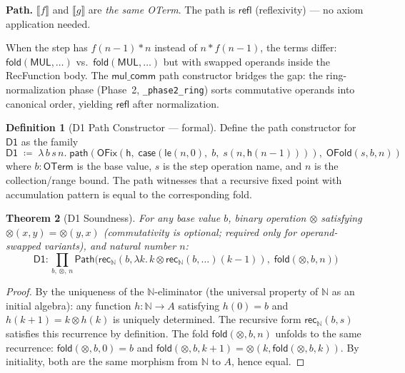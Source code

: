 \documentclass[11pt,a4paper]{report}
\theoremstyle{definition}
\newtheorem{definition}{Definition}[chapter]
\theoremstyle{plain}
\newtheorem{theorem}[definition]{Theorem}
\newcommand{\den}[1]{\llbracket #1 \rrbracket}
\newcommand{\Path}{\mathsf{Path}}
\newcommand{\Nat}{\mathbb{N}}
\newcommand{\fold}{\mathsf{fold}}
\newcommand{\rec}{\mathsf{rec}}
\begin{document}
\textbf{Path.}
$\den{f}$ and $\den{g}$ are \emph{the same OTerm}.  The path is
$\mathsf{refl}$ (reflexivity) --- no axiom application needed.

When the step has $f(n-1) * n$ instead of $n * f(n-1)$, the terms
differ: $\fold(\mathsf{MUL}, \ldots)$ vs.\ $\fold(\mathsf{MUL},
\ldots)$ but with swapped operands inside the RecFunction body.
The $\mathsf{mul\_comm}$ path constructor bridges the gap:
the ring-normalization phase (Phase~2, \texttt{\_phase2\_ring})
sorts commutative operands into canonical order, yielding
$\mathsf{refl}$ after normalization.

\begin{definition}[D1 Path Constructor --- formal]
\label{def:d1-path}
Define the path constructor for $\mathsf{D1}$ as the family
\[
  \mathsf{D1} \;\coloneqq\; \lambda\, b\, s\, n.\;
  \mathsf{path}(\mathsf{OFix}(\mathsf{h},\;
    \mathsf{case}(\mathsf{le}(n, 0),\; b,\; s(n, \mathsf{h}(n-1)))),\;
  \mathsf{OFold}(s, b, n))
\]
where $b : \mathsf{OTerm}$ is the base value, $s$ is the step
operation name, and $n$ is the collection/range bound.  The path
witnesses that a recursive fixed point with accumulation pattern
is equal to the corresponding fold.
\end{definition}

\begin{theorem}[D1 Soundness]
\label{thm:d1-sound}
For any base value $b$, binary operation $\otimes$ satisfying
$\otimes(x, y) = \otimes(y, x)$ (commutativity is optional;
required only for operand-swapped variants), and natural number $n$:
\[
  \mathsf{D1} : \prod_{b,\, \otimes,\, n}
  \Path\!\big(\rec_\Nat(b, \lambda k.\, k \otimes \rec_\Nat(b, \ldots)(k-1)),\;
  \fold(\otimes, b, n)\big)
\]
\end{theorem}

\begin{proof}
By the uniqueness of the $\Nat$-eliminator (the universal property of
$\Nat$ as an initial algebra):  any function $h : \Nat \to A$ satisfying
$h(0) = b$ and $h(k+1) = k \otimes h(k)$ is uniquely determined.
The recursive form $\rec_\Nat(b, s)$ satisfies this recurrence by
definition.  The fold $\fold(\otimes, b, n)$ unfolds to the same
recurrence: $\fold(\otimes, b, 0) = b$ and $\fold(\otimes, b, k+1)
= \otimes(k, \fold(\otimes, b, k))$.  By initiality, both are the
same morphism from $\Nat$ to $A$, hence equal.
\end{proof}
\end{document}
